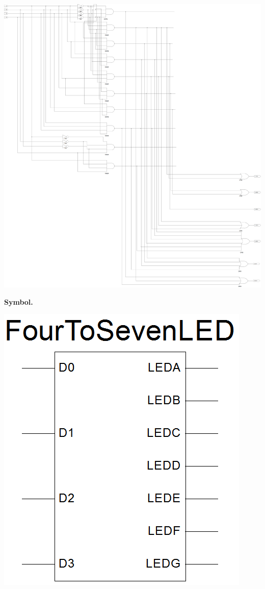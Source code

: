 \documentclass[9pt]{article}
\begin{document}
\begin{enumerate}
             \begin{center}
                \includegraphics[width=\textwidth]{FourToSevenLEDs.png}
             \end{center}
             
             \newpage
             \textbf{Symbol.}
   
             \begin{center}
                \includegraphics[width=\textwidth]{FourToSevenLEDsSym.png}
             \end{center}
             

\end{enumerate}
\end{document}
